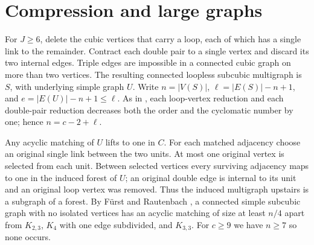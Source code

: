 \documentclass[11pt]{article}
\begin{document}
\section{Compression and large graphs}\label{compression}
For $J\ge6$, delete the cubic vertices that carry a loop, each of which has a single link to the remainder. Contract each double pair to a single vertex and discard its two internal edges. Triple edges are impossible in a connected cubic graph on more than two vertices. The resulting connected loopless subcubic multigraph is $S$, with underlying simple graph $U$. Write $n=|V(S)|$, $\ell=|E(S)|-n+1$, and $e=|E(U)|-n+1\le\ell$. As in \cite[Section 2]{prev}, each loop-vertex reduction and each double-pair reduction decreases both the order and the cyclomatic number by one; hence $n=c-2+\ell$.

Any acyclic matching of $U$ lifts to one in $C$. For each matched adjacency choose an original single link between the two units. At most one original vertex is selected from each unit. Between selected vertices every surviving adjacency maps to one in the induced forest of $U$; an original double edge is internal to its unit and an original loop vertex was removed. Thus the induced multigraph upstairs is a subgraph of a forest. By F\"urst and Rautenbach \cite[Theorem 2]{FR}, a connected simple subcubic graph with no isolated vertices has an acyclic matching of size at least $n/4$ apart from $K_{2,3}$, $K_4$ with one edge subdivided, and $K_{3,3}$. For $c\ge9$ we have $n\ge7$ so none occurs.
\end{document}
